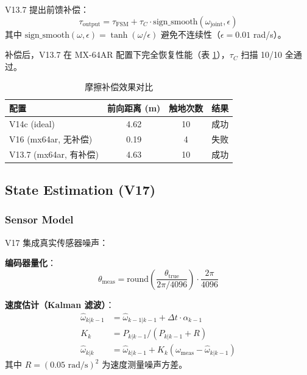 V13.7 提出前馈补偿：
\begin{equation}
    \tau_{\text{output}} = \tau_{\text{FSM}} + \tau_C \cdot \text{sign\_smooth}(\omega_{\text{joint}}, \epsilon)
\end{equation}
其中 $\text{sign\_smooth}(\omega, \epsilon) = \tanh(\omega / \epsilon)$ 避免不连续性（$\epsilon = 0.01$ rad/s）。

补偿后，V13.7 在 MX-64AR 配置下完全恢复性能（表 \ref{tab:friction_comp}），$\tau_C$ 扫描 10/10 全通过。

\begin{table}[t]
\centering
\caption{摩擦补偿效果对比}
\label{tab:friction_comp}
\begin{tabular}{@{}lccc@{}}
\toprule
配置 & 前向距离 (m) & 触地次数 & 结果 \\
\midrule
V14c (ideal) & 4.62 & 10 & 成功 \\
V16 (mx64ar, 无补偿) & 0.19 & 4 & 失败 \\
V13.7 (mx64ar, 有补偿) & 4.63 & 10 & 成功 \\
\bottomrule
\end{tabular}
\end{table}

\subsection{State Estimation (V17)}

\subsubsection{Sensor Model}

V17 集成真实传感器噪声：

\textbf{编码器量化}：
\begin{equation}
    \theta_{\text{meas}} = \text{round}\left(\frac{\theta_{\text{true}}}{2\pi / 4096}\right) \cdot \frac{2\pi}{4096}
\end{equation}

\textbf{速度估计（Kalman 滤波）}：
\begin{align}
    \hat{\omega}_{k|k-1} &= \hat{\omega}_{k-1|k-1} + \Delta t \cdot \alpha_{k-1} \\
    K_k &= P_{k|k-1} / (P_{k|k-1} + R) \\
    \hat{\omega}_{k|k} &= \hat{\omega}_{k|k-1} + K_k (\omega_{\text{meas}} - \hat{\omega}_{k|k-1})
\end{align}
其中 $R = (0.05 \text{ rad/s})^2$ 为速度测量噪声方差。

